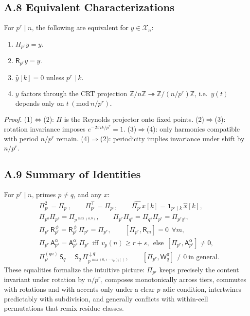 \documentclass[12pt]{article}
\numberwithin{equation}{section}
\theoremstyle{plain}
\theoremstyle{definition}
\theoremstyle{remark}
\begin{document}
\subsection*{A.8 Equivalent Characterizations}
For $p^r\mid n$, the following are equivalent for $y\in\mathcal{X}_n$:
\begin{enumerate}
\item $\Pi_{p^r}y=y$.
\item $\mathsf{R}_{p^r}y=y$.
\item $\widehat{y}[k]=0$ unless $p^r\mid k$.
\item $y$ factors through the CRT projection $\mathbb{Z}/n\mathbb{Z}\twoheadrightarrow \mathbb{Z}/(n/p^r)\mathbb{Z}$, i.e.\ $y(t)$ depends only on $t\ (\mathrm{mod}\ n/p^r)$.
\end{enumerate}
\emph{Proof.} (1)$\Leftrightarrow$(2): $\Pi$ is the Reynolds projector onto fixed points. (2)$\Rightarrow$(3): rotation invariance imposes $e^{-2\pi i k/p^r}=1$. (3)$\Rightarrow$(4): only harmonics compatible with period $n/p^r$ remain. (4)$\Rightarrow$(2): periodicity implies invariance under shift by $n/p^r$.

\subsection*{A.9 Summary of Identities}
For $p^r\mid n$, primes $p\neq q$, and any $x$:
\begin{align*}
&\Pi_{p^r}^2=\Pi_{p^r},\qquad \Pi_{p^r}^\top=\Pi_{p^r},\qquad
\widehat{\Pi_{p^r}x}[k]=\mathbf{1}_{p^r\mid k}\,\widehat{x}[k],\\
&\Pi_{p^a}\Pi_{p^b}=\Pi_{p^{\max(a,b)}},\qquad
\Pi_{p^r}\Pi_{q^s}=\Pi_{q^s}\Pi_{p^r}=\Pi_{p^r q^s},\\
&\Pi_{p^r}\,\mathsf{R}_{p^r}^{\,\phi}=\mathsf{R}_{p^r}^{\,\phi}\,\Pi_{p^r}=\Pi_{p^r},\qquad
[\Pi_{p^r},\mathsf{R}_m]=0\ \ \forall m,\\
&\Pi_{p^r}\,\mathsf{A}_{p^s}^{\alpha}=\mathsf{A}_{p^s}^{\alpha}\,\Pi_{p^r}\ \ \text{iff}\ \ v_p(n)\ge r+s,\ \ \text{else}\ \ [\Pi_{p^r},\mathsf{A}_{p^s}^{\alpha}]\neq 0,\\
&\Pi_{p^r}^{(qn)}\,\mathsf{S}_q=\mathsf{S}_q\,\Pi_{p^{\,\max(0,\,r-v_p(q))}}^{\downarrow q},\qquad
[\Pi_{p^r},\mathsf{W}_q^{\pi}]\neq 0\ \text{in general}.
\end{align*}
These equalities formalize the intuitive picture: $\Pi_{p^r}$ keeps precisely the content invariant under rotation by $n/p^r$, composes monotonically across tiers, commutes with rotations and with accents only under a clear $p$-adic condition, intertwines predictably with subdivision, and generally conflicts with within-cell permutations that remix residue classes.
\end{document}
